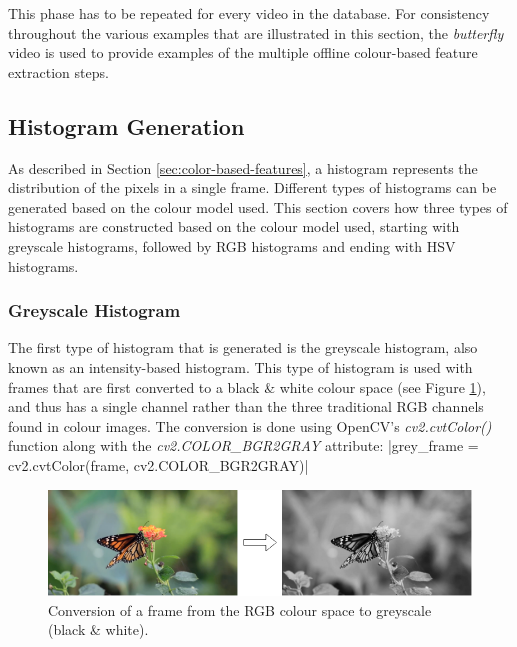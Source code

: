This phase has to be repeated for every video in the database. For consistency throughout the various examples that are illustrated in this section, the \textit{butterfly} video is used to provide examples of the multiple offline colour-based feature extraction steps.


\subsection{Histogram Generation}

As described in Section \ref{sec:color-based-features}, a histogram represents the distribution of the pixels in a single frame. Different types of histograms can be generated based on the colour model used. This section covers how three types of histograms are constructed based on the colour model used, starting with greyscale histograms, followed by RGB histograms and ending with HSV histograms.


\subsubsection{Greyscale Histogram}
\label{sec:implementation-greyscale-histogram}

The first type of histogram that is generated is the greyscale histogram, also known as an intensity-based histogram. This type of histogram is used with frames that are first converted to a black \& white colour space (see Figure \ref{fig:rgb_to_greyscale}), and thus has a single channel rather than the three traditional RGB channels found in colour images. The conversion is done using OpenCV's \textit{cv2.cvtColor()} function along with the \textit{cv2.COLOR\_BGR2GRAY} attribute: 
|grey_frame = cv2.cvtColor(frame, cv2.COLOR_BGR2GRAY)|

\begin{figure}[h] 
\centerline{\includegraphics[width=\textwidth]{figures/implementation/rgb_to_greyscale.png}}
\caption{\label{fig:rgb_to_greyscale}Conversion of a frame from the RGB colour space to greyscale (black \& white).}
\end{figure}

